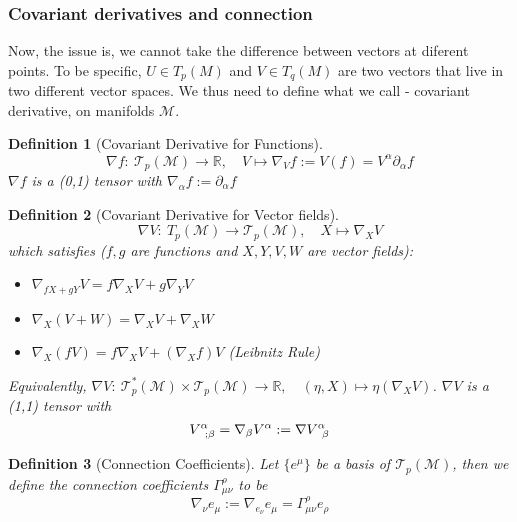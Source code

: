 \documentclass[a4paper]{article}
\theoremstyle{new}
\newtheorem{defi}{Definition}[section]
\begin{document}
\subsubsection{Covariant derivatives and connection}
Now, the issue is, we cannot take the difference between vectors at diferent points. To be specific, $U\in T_p(M)$ and $V\in T_q(M)$ are two vectors that live in two different vector spaces. We thus need to define what we call - covariant derivative, on manifolds $\mathcal{M}$.
\begin{defi}[Covariant Derivative for Functions]
$$\nabla  f:~\mathcal{T}_p(\mathcal{M})\rightarrow\mathbb{R},\quad V\mapsto\nabla_Vf:=V(f)=V^\alpha\partial_\alpha f$$
$\nabla f$ is a (0,1) tensor with $\nabla_\alpha f:=\partial_\alpha f$
\end{defi}
\begin{defi}[Covariant Derivative for Vector fields]
$$\nabla  V:~T_p(\mathcal{M})\rightarrow\mathcal{T}_p(\mathcal{M}),\quad X\mapsto\nabla_XV$$
which satisfies ($f,g$ are functions and $X,Y,V,W$ are vector fields):
\begin{itemize}
    \item $\nabla_{fX+gY}V=f\nabla_XV+g\nabla_YV$
    \item $\nabla_X(V+W)=\nabla_XV+\nabla_XW$
    \item $\nabla_X(fV)=f\nabla_XV+(\nabla_Xf)V$ (Leibnitz Rule)
\end{itemize}
Equivalently, $\nabla V:~\mathcal{T}_p^*(\mathcal{M})\times \mathcal{T}_p(\mathcal{M})\rightarrow\mathbb{R},\quad (\eta,X)\mapsto\eta(\nabla_XV)$. $\nabla V$ is a (1,1) tensor with $$\tensor*{V}{*_{}^{\alpha}_{;\beta}}=\nabla_\beta V^\alpha:=\tensor*{\nabla V}{*_{}^{\alpha}_{\beta}}$$ 
\end{defi}
\begin{defi}[Connection Coefficients]
Let $\{e^\mu\}$ be a basis of $\mathcal{T}_p(\mathcal{M})$, then we define the connection coefficients $\Gamma^\rho_{\mu\nu}$ to be
$$\nabla_\nu e_\mu:=\nabla_{e_\nu}e_\mu=\Gamma_{\mu\nu}^\rho e_\rho$$
\end{defi}
\end{document}
